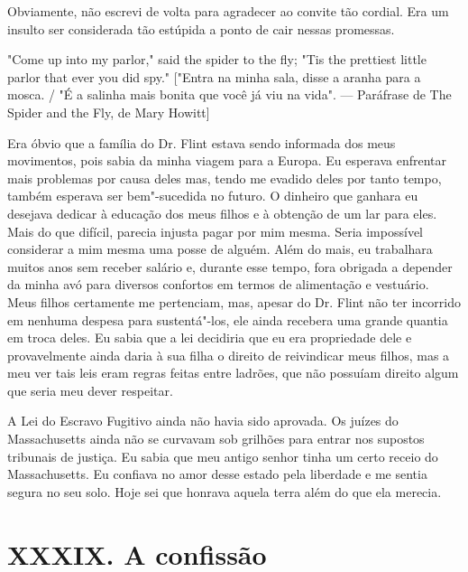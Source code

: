 Obviamente, não escrevi de volta para
agradecer ao convite tão cordial. Era um insulto ser considerada tão
estúpida a ponto de cair nessas promessas.

"Come up into my parlor," said the spider to the fly; "Tis the prettiest
little parlor that ever you did spy." {[}"Entra na minha sala, disse a
aranha para a mosca. / "É a salinha mais bonita que você já viu na
vida". --- Paráfrase de The Spider and the Fly, de Mary Howitt{]}

Era óbvio que a família do Dr. Flint
estava sendo informada dos meus movimentos, pois sabia da minha viagem
para a Europa. Eu esperava enfrentar mais problemas por causa deles mas,
tendo me evadido deles por tanto tempo, também esperava ser bem"-sucedida
no futuro. O dinheiro que ganhara eu desejava dedicar à educação dos
meus filhos e à obtenção de um lar para eles. Mais do que difícil,
parecia injusta pagar por mim mesma. Seria impossível considerar a mim
mesma uma posse de alguém. Além do mais, eu trabalhara muitos anos sem
receber salário e, durante esse tempo, fora obrigada a depender da minha
avó para diversos confortos em termos de alimentação e vestuário. Meus
filhos certamente me pertenciam, mas, apesar do Dr. Flint não ter
incorrido em nenhuma despesa para sustentá"-los, ele ainda recebera uma
grande quantia em troca deles. Eu sabia que a lei decidiria que eu era
propriedade dele e provavelmente ainda daria à sua filha o direito de
reivindicar meus filhos, mas a meu ver tais leis eram regras feitas
entre ladrões, que não possuíam direito algum que seria meu dever
respeitar.

A Lei do Escravo Fugitivo ainda não
havia sido aprovada. Os juízes do Massachusetts ainda não se curvavam
sob grilhões para entrar nos supostos tribunais de justiça. Eu sabia que
meu antigo senhor tinha um certo receio do Massachusetts. Eu confiava no
amor desse estado pela liberdade e me sentia segura no seu solo. Hoje
sei que honrava aquela terra além do que ela merecia.

\chapter{XXXIX. A confissão}

